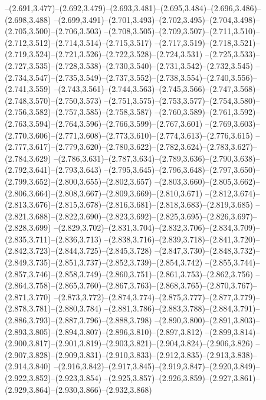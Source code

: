   --(2.691,3.477)--(2.692,3.479)--(2.693,3.481)--(2.695,3.484)--(2.696,3.486)--(2.698,3.488)%
  --(2.699,3.491)--(2.701,3.493)--(2.702,3.495)--(2.704,3.498)--(2.705,3.500)--(2.706,3.503)%
  --(2.708,3.505)--(2.709,3.507)--(2.711,3.510)--(2.712,3.512)--(2.714,3.514)--(2.715,3.517)%
  --(2.717,3.519)--(2.718,3.521)--(2.719,3.524)--(2.721,3.526)--(2.722,3.528)--(2.724,3.531)%
  --(2.725,3.533)--(2.727,3.535)--(2.728,3.538)--(2.730,3.540)--(2.731,3.542)--(2.732,3.545)%
  --(2.734,3.547)--(2.735,3.549)--(2.737,3.552)--(2.738,3.554)--(2.740,3.556)--(2.741,3.559)%
  --(2.743,3.561)--(2.744,3.563)--(2.745,3.566)--(2.747,3.568)--(2.748,3.570)--(2.750,3.573)%
  --(2.751,3.575)--(2.753,3.577)--(2.754,3.580)--(2.756,3.582)--(2.757,3.585)--(2.758,3.587)%
  --(2.760,3.589)--(2.761,3.592)--(2.763,3.594)--(2.764,3.596)--(2.766,3.599)--(2.767,3.601)%
  --(2.769,3.603)--(2.770,3.606)--(2.771,3.608)--(2.773,3.610)--(2.774,3.613)--(2.776,3.615)%
  --(2.777,3.617)--(2.779,3.620)--(2.780,3.622)--(2.782,3.624)--(2.783,3.627)--(2.784,3.629)%
  --(2.786,3.631)--(2.787,3.634)--(2.789,3.636)--(2.790,3.638)--(2.792,3.641)--(2.793,3.643)%
  --(2.795,3.645)--(2.796,3.648)--(2.797,3.650)--(2.799,3.652)--(2.800,3.655)--(2.802,3.657)%
  --(2.803,3.660)--(2.805,3.662)--(2.806,3.664)--(2.808,3.667)--(2.809,3.669)--(2.810,3.671)%
  --(2.812,3.674)--(2.813,3.676)--(2.815,3.678)--(2.816,3.681)--(2.818,3.683)--(2.819,3.685)%
  --(2.821,3.688)--(2.822,3.690)--(2.823,3.692)--(2.825,3.695)--(2.826,3.697)--(2.828,3.699)%
  --(2.829,3.702)--(2.831,3.704)--(2.832,3.706)--(2.834,3.709)--(2.835,3.711)--(2.836,3.713)%
  --(2.838,3.716)--(2.839,3.718)--(2.841,3.720)--(2.842,3.723)--(2.844,3.725)--(2.845,3.728)%
  --(2.847,3.730)--(2.848,3.732)--(2.849,3.735)--(2.851,3.737)--(2.852,3.739)--(2.854,3.742)%
  --(2.855,3.744)--(2.857,3.746)--(2.858,3.749)--(2.860,3.751)--(2.861,3.753)--(2.862,3.756)%
  --(2.864,3.758)--(2.865,3.760)--(2.867,3.763)--(2.868,3.765)--(2.870,3.767)--(2.871,3.770)%
  --(2.873,3.772)--(2.874,3.774)--(2.875,3.777)--(2.877,3.779)--(2.878,3.781)--(2.880,3.784)%
  --(2.881,3.786)--(2.883,3.788)--(2.884,3.791)--(2.886,3.793)--(2.887,3.796)--(2.888,3.798)%
  --(2.890,3.800)--(2.891,3.803)--(2.893,3.805)--(2.894,3.807)--(2.896,3.810)--(2.897,3.812)%
  --(2.899,3.814)--(2.900,3.817)--(2.901,3.819)--(2.903,3.821)--(2.904,3.824)--(2.906,3.826)%
  --(2.907,3.828)--(2.909,3.831)--(2.910,3.833)--(2.912,3.835)--(2.913,3.838)--(2.914,3.840)%
  --(2.916,3.842)--(2.917,3.845)--(2.919,3.847)--(2.920,3.849)--(2.922,3.852)--(2.923,3.854)%
  --(2.925,3.857)--(2.926,3.859)--(2.927,3.861)--(2.929,3.864)--(2.930,3.866)--(2.932,3.868)%
